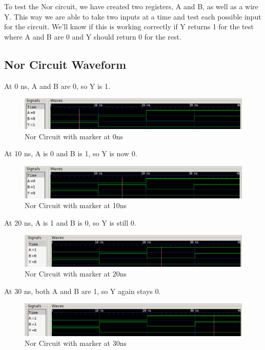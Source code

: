 \documentclass[12pt]{article}
\begin{document}
To test the Nor circuit, we have created two registers, A and B, as well as a wire Y. This way we are able to take two inputs at a time and test each possible input for the circuit. We'll know if this is working correctly if Y returns 1 for the test where A and B are 0 and Y should return 0 for the rest.

\subsection{Nor Circuit Waveform}

At 0 ns, A and B are 0, so Y is 1.
\begin{figure}[H]
    \centering
    \includegraphics[width = 1.0\textwidth]{nor/nor_wave1.PNG}
    \caption{Nor Circuit with marker at 0ns}
    \label{fig:enter-label}
\end{figure}

At 10 ns, A is 0 and B is 1, so Y is now 0.
\begin{figure}[H]
    \centering
    \includegraphics[width = 1.0\textwidth]{nor/nor_wave2.PNG}
    \caption{Nor Circuit with marker at 10ns}
    \label{fig:enter-label}
\end{figure}

At 20 ns, A is 1 and B is 0, so Y is still 0.
\begin{figure}[H]
    \centering
    \includegraphics[width = 1.0\textwidth]{nor/nor_wave3.PNG}
    \caption{Nor Circuit with marker at 20ns}
    \label{fig:enter-label}
\end{figure}

At 30 ns, both A and B are 1, so Y again stays 0.
\begin{figure}[H]
    \centering
    \includegraphics[width = 1.0\textwidth]{nor/nor_wave4.PNG}
    \caption{Nor Circuit with marker at 30ns}
    \label{fig:enter-label}
\end{figure}
\end{document}
